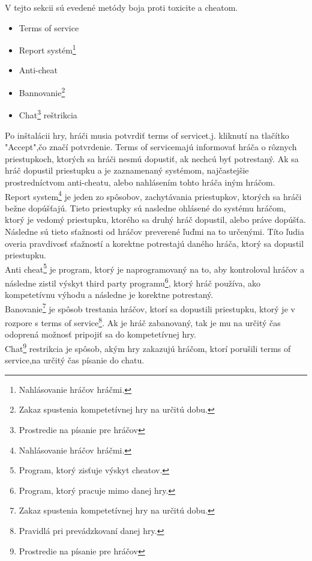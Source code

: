 \documentclass[twoside,twocolumn]{article}
\begin{document}
V tejto sekcii sú evedené metódy boja proti toxicite a cheatom\footnotemark[1].
\begin{itemize}
\item Terms of service\footnotemark[2] 
\item Report systém\footnote[6]{Nahlásovanie hráčov hráčmi.}
\item Anti-cheat\footnotemark[3]
\item Bannovanie\footnote[7]{Zakaz spustenia kompetetívnej hry na určitú dobu.}
\item Chat\footnote[8]{Prostredie na písanie pre hráčov} reštrikcia
\end{itemize}
	Po inštalácii hry, hráči musia potvrdiť terms of service\footnotemark[2]t.j. kliknutí na tlačítko "Accept",čo značí potvrdenie. Terms of service\footnotemark[2] majú informovať hráča o rôznych priestupkoch, ktorých sa hráči nesmú dopustiť, ak nechcú byť potrestaný. Ak sa hráč dopustil priestupku a je zaznamenaný systémom, najčastejšie prostredníctvom anti-cheatu\footnotemark[3], alebo nahlásením tohto hráča iným hráčom.\\
	Report system\footnote[1]{Nahlásovanie hráčov hráčmi.} je jeden zo spôsobov, zachytávania priestupkov, ktorých sa hráči bežne dopúšťajú. Tieto priestupky sú nasledne ohlásené do systému hráčom, ktorý je vedomý priestupku, ktorého sa druhý hráč dopustil, alebo práve dopúšťa. Následne sú tieto sťažnosti od hráčov preverené ľuďmi na to určenými. Títo ľudia overia pravdivosť sťažností a korektne potrestajú daného hráča, ktorý sa dopustil priestupku.\\
	Anti cheat\footnote[2]{Program, ktorý zisťuje výskyt cheatov.} je program, ktorý je naprogramovaný na to, aby kontroloval hráčov a následne zistil výskyt third party programu\footnote[3]{Program, ktorý pracuje mimo danej hry.}, ktorý hráč používa, ako kompetetívnu výhodu a následne je korektne potrestaný.\\
	Banovanie\footnote[4]{Zakaz spustenia kompetetívnej hry na určitú dobu.} je spôsob trestania hráčov, ktorí sa dopustili priestupku, ktorý je v rozpore s terms of service\footnote[5]{Pravidlá pri prevádzkovaní danej hry.}. Ak je hráč zabanovaný\footnotemark[4], tak je mu na určitý čas odoprená možnosť pripojiť sa do kompetetívnej hry.\\
	Chat\footnote[6]{Prostredie na písanie pre hráčov} restrikcia je spôsob, akým hry zakazujú hráčom, ktorí porušili terms of service\footnotemark[5],na určitý čas písanie do chatu.

\end{document}

